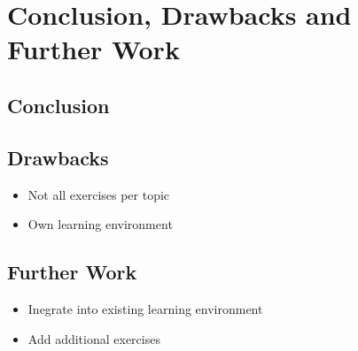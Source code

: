 \chapter{Conclusion, Drawbacks and Further Work}
\label{chapter:conclusionDrawBackFurtherWork}

\section{Conclusion}

%

\section{Drawbacks}

\begin{itemize}
    \item Not all exercises per topic
    \item Own learning environment
\end{itemize}

\section{Further Work}

\begin{itemize}
    \item Inegrate into existing learning environment
    \item Add additional exercises
\end{itemize}